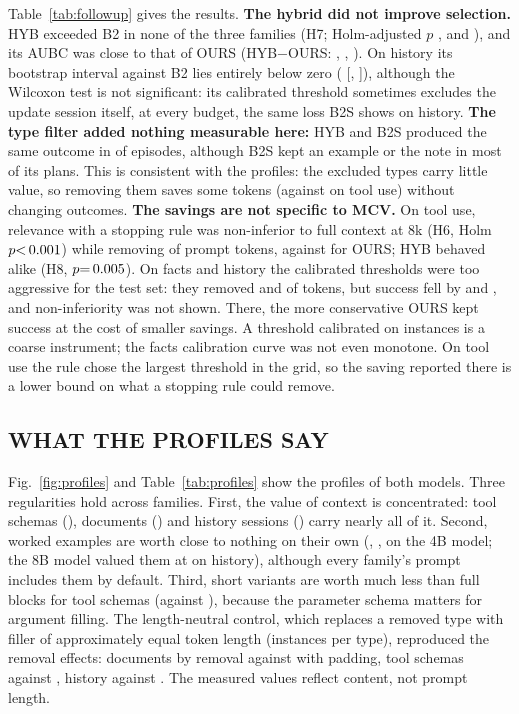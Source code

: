 Table~\ref{tab:followup} gives the results. \textbf{The hybrid did not improve selection.} HYB exceeded B2 in none of the
three families (H7; Holm-adjusted $p$ \RHSevenFactsP, \RHSevenHistoryP and \RHSevenToolP), and its AUBC was close to that of OURS
(HYB$-$OURS: \RHybVsOursFacts, \RHybVsOursHistory, \RHybVsOursTool). On history its bootstrap interval against B2 lies
entirely below zero (\RHSevenHistoryDiff{} [\RHSevenHistoryLo, \RHSevenHistoryHi]), although the Wilcoxon test is not
significant: its calibrated threshold sometimes excludes the update session itself, at every budget, the same loss
B2S shows on history. \textbf{The type filter added nothing measurable here:} HYB and
B2S produced the same outcome in \RHybStopSame of episodes, although B2S kept an example or the note in most of its plans. This
is consistent with the profiles: the excluded types carry little value, so removing them saves some tokens
(\RTokCutHybTool against \RTokCutStopTool on tool use) without changing outcomes. \textbf{The savings are not specific to MCV.} On tool use,
relevance with a stopping rule was non-inferior to full context at 8k (H6, Holm $p{<}\,0.001$) while removing
\RTokCutStopTool of prompt tokens, against \RTokCutTool for OURS; HYB behaved alike (H8, $p{=}\,0.005$). On facts and
history the calibrated thresholds were too aggressive for the test set: they removed \RTokCutStopFacts and
\RTokCutStopHistory of tokens, but success fell by \RHSixFactsDiff{} and \RHSixHistoryDiff{}, and non-inferiority was not
shown. There, the more conservative OURS kept success at the cost of smaller savings. A threshold calibrated on
\RNCalib instances is a coarse instrument; the facts calibration curve was not even monotone. On tool use the rule chose the
largest threshold in the grid, so the saving reported there is a lower bound on what a stopping rule could remove.

\subsection{WHAT THE PROFILES SAY}
Fig.~\ref{fig:profiles} and Table~\ref{tab:profiles} show the profiles of both models. Three regularities hold across families. First,
the value of context is concentrated: tool schemas (\RMcvToolToolSchema), documents (\RMcvFactsFact) and history
sessions (\RMcvHistoryHistoryTurn) carry nearly all of it. Second, worked examples are worth close to nothing
on their own (\RMcvFactsExample, \RMcvHistoryExample, \RMcvToolExample on the 4B model; the 8B model valued them
at \RMcvEightHistoryExample on history), although every family's prompt includes them by default. Third, short variants are worth much less than full blocks for tool schemas
(\RShortToolToolSchema against \RMcvToolToolSchema), because the parameter schema matters for argument filling.
The length-neutral control, which replaces a removed type with filler of approximately equal token length (\RPadN instances per
type), reproduced the removal effects: documents \RRemFactsFact by removal against \RPadFactsFact with padding, tool
schemas \RRemToolToolSchema against \RPadToolToolSchema, history \RRemHistoryHistoryTurn against
\RPadHistoryHistoryTurn. The measured values reflect content, not prompt length.

